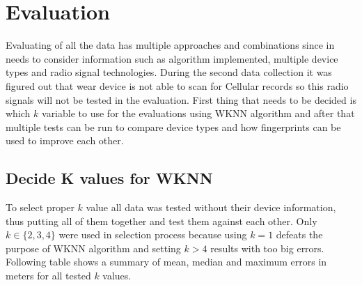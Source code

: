 \section{Evaluation}\label{sec:Evaluation}
Evaluating of all the data has multiple approaches and combinations since in needs to consider information such as algorithm implemented, multiple device types and radio signal technologies. During the second data collection it was figured out that wear device is not able to scan for Cellular records so this radio signals will not be tested in the evaluation. First thing that needs to be decided is which $k$ variable to use for the evaluations using WKNN algorithm and after that multiple tests can be run to compare device types and how fingerprints can be used to improve each other.

\subsection{Decide K values for WKNN}\label{sec:TestingKValuesForWKNN}
To select proper $k$ value all data was tested without their device information, thus putting all of them together and test them against each other. Only $k \in \{2, 3, 4\}$ were used in selection process because using $k = 1$ defeats the purpose of WKNN algorithm and setting $k > 4$ results with too big errors. Following table shows a summary of mean, median and maximum errors in meters for all tested $k$ values.

\begin{table}[h]
	\begin{center}
		\caption{List of errors for multiple K values}
		\label{tab04c06}
	\end{center}
\end{table}

